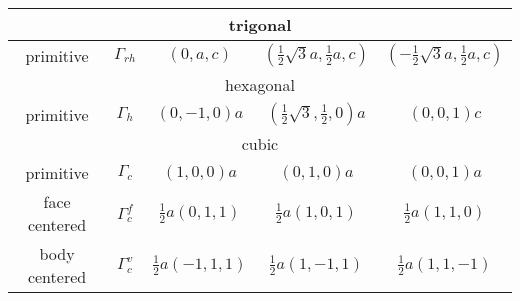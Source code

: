 \documentclass[11pt,a4paper]{report}
\begin{document}
\begin{center}
\begin{tabular}{|c|c|c|c|c|}
\hline
%
\hline
\multicolumn{5}{|c|}{trigonal}\\
\hline
primitive & $\Gamma_{rh}$ & 
$(0,a,c)$ & 
$(\frac{1}{2}\sqrt{3}a,\frac{1}{2}a,c)$ &
$(-\frac{1}{2}\sqrt{3}a,\frac{1}{2}a,c)$ \\
\hline
%
\hline
\multicolumn{5}{|c|}{hexagonal}\\
\hline
primitive & $\Gamma_h$ & 
$(0,-1,0)a$ & 
$(\frac{1}{2}\sqrt{3},\frac{1}{2},0)a$ &
$(0,0,1)c$\\
\hline
%
\hline
\multicolumn{5}{|c|}{cubic}\\
\hline
primitive & $\Gamma_c$ & 
$(1,0,0)a$ & 
$(0,1,0)a$ & 
$(0,0,1)a$ \\
face centered & $\Gamma_c^f$ & 
$\frac{1}{2}a(0,1,1)$ & 
$\frac{1}{2}a(1,0,1)$ & 
$\frac{1}{2}a(1,1,0)$ \\
body centered & $\Gamma_c^v$ & 
$\frac{1}{2}a(-1,1,1)$ & 
$\frac{1}{2}a(1,-1,1)$ & 
$\frac{1}{2}a(1,1,-1)$ \\
\hline
\end{tabular}
\end{center}

\end{document}
